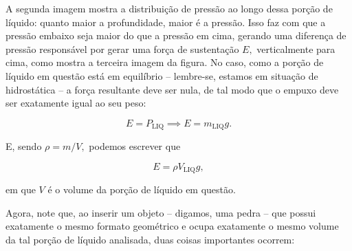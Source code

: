 A segunda imagem mostra a distribuição de pressão ao longo dessa porção de líquido: quanto maior a profundidade, maior é a pressão. Isso faz com que a pressão embaixo seja maior do que a pressão em cima, gerando uma diferença de pressão responsável por gerar uma força de sustentação $E,$ verticalmente para cima, como mostra a terceira imagem da figura. No caso, como a porção de líquido em questão está em equilíbrio -- lembre-se, estamos em situação de hidrostática -- a força resultante deve ser nula, de tal modo que o empuxo deve ser exatamente igual ao seu peso:

$$ E = P_\text{LIQ} \implies E = m_\text{LIQ}g.$$

E, sendo $\rho = m/V,$ podemos escrever que

\begin{equation}
     E = \rho V_\text{LIQ}g, 
     \label{eq_fluido_manipulacaoempuxo}
\end{equation}

\noindent em que $V$ é o volume da porção de líquido em questão. 


Agora, note que, ao inserir um objeto -- digamos, uma pedra -- que possui exatamente o mesmo formato geométrico e ocupa exatamente o mesmo volume da tal porção de líquido analisada, duas coisas importantes ocorrem:

